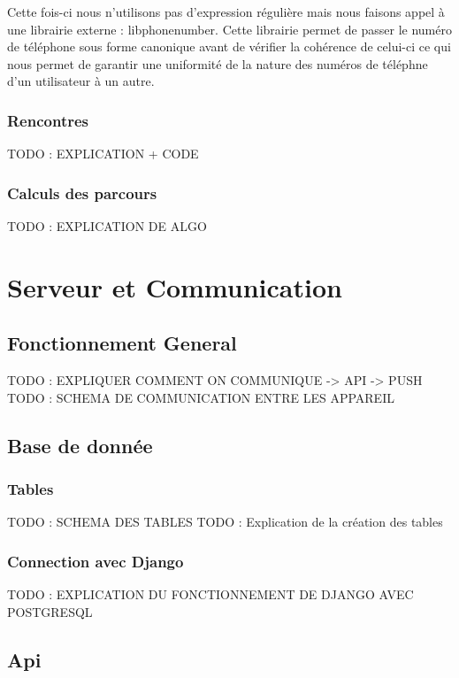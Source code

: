 \documentclass[french]{article}
\begin{document}
	Cette fois-ci nous n'utilisons pas d'expression régulière mais nous faisons appel à une librairie externe : libphonenumber.
	Cette librairie permet de passer le numéro de téléphone sous forme canonique avant de vérifier la cohérence de celui-ci ce qui nous permet de garantir une uniformité de la nature des numéros de téléphne d'un utilisateur à un autre.
	
	 
	
	\subsubsection{Rencontres}
	
	TODO : EXPLICATION + CODE
	
	\subsubsection{Calculs des parcours}
	
	TODO : EXPLICATION DE ALGO
	
	
	\section{Serveur et Communication}	
	\subsection{Fonctionnement General}
	
	TODO : EXPLIQUER COMMENT ON COMMUNIQUE -> API -> PUSH
	TODO : SCHEMA DE COMMUNICATION ENTRE LES APPAREIL 
	
	\subsection{Base de donnée}
	\subsubsection{Tables}
	
	TODO : SCHEMA DES TABLES
	TODO : Explication de la création des tables 
	
	\subsubsection{Connection avec Django}
	
	TODO : EXPLICATION DU FONCTIONNEMENT DE DJANGO AVEC POSTGRESQL
	
	\subsection{Api}
	
\end{document}
